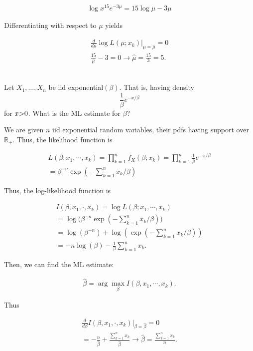 \documentclass{homework}
\begin{document}
\begin{align*}
    \log x^{15}e^{-3\mu} = 15 \log \mu - 3 \mu
\end{align*}

Differentiating with respect to $\mu$ yields

\begin{align*}
    \frac{d}{d\mu} \log L(\mu;x_k)\bigg|_{\mu = \hat{\mu}} = 0 \\
    \frac{15}{\hat{\mu}} - 3 = 0 \longrightarrow \hat{\mu} = \frac{15}{3} = 5. 
\end{align*} \\

\begin{tcolorbox}[title=Question 4]
Let $X_1,\ldots, X_n$ be iid exponential$(\beta)$. That is, having density
$$\frac{1}{\beta} e^{-x/\beta} $$
for $x \mbox{\textgreater} 0$. What is the ML estimate for $\beta$?
\end{tcolorbox}

We are given $n$ iid exponential random variables, their pdfs having support over $\mathds{R}_{+}$. Thus, the likelihood function is

\begin{align*}
    L(\beta; x_1, \cdots, x_k) = \prod_{k=1}^{n} f_{X}(\beta; x_k) 
    = \prod_{k=1}^{n} \frac{1}{\beta} e^{-x/\beta} \\
    = \beta^{-n} \exp\left(-\sum_{k=1}^{n} x_k/\beta\right)  
\end{align*}

Thus, the log-likelihood function is 

\begin{align*}
    I(\beta, x_1, \cdot, x_k) = \log L(\beta; x_1, \cdots, x_k) \\
    = \log \bigg( \beta^{-n} \exp(-\sum_{k=1}^{n} x_k/\beta) \bigg)\\
    = \log\left(\beta^{-n}\right) + \log\left( \exp(-\sum_{k=1}^{n} x_k/\beta)\right) \\
    = -n \log(\beta) - \frac{1}{\beta} \sum_{k=1}^{n} x_k.
\end{align*}

Then, we can find the ML estimate:

\begin{align*}
    \hat{\beta} = \arg \max_{\beta} I(\beta, x_1, \cdots, x_k).
\end{align*}

Thus

\begin{align*}
    \frac{d}{d\beta} I(\beta, x_1, \cdot, x_k)\bigg|_{\beta= \hat{\beta}} = 0 \\
    = -\frac{n}{\hat{\beta}} + \frac{\sum_{k=1}^{n} x_k}{\hat{\beta}} \longrightarrow \hat{\beta} = \frac{\sum_{k=1}^{n} x_k}{n}.
\end{align*} \\
\end{document}
